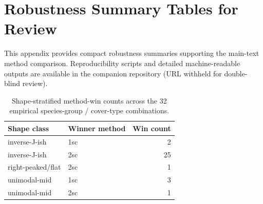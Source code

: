 \section{Robustness Summary Tables for Review}
\setcounter{table}{0}
\renewcommand{\thetable}{\thesection\arabic{table}}

This appendix provides compact robustness summaries supporting the main-text method comparison. Reproducibility scripts and detailed machine-readable outputs are available in the companion repository (URL withheld for double-blind review).

\begin{table}[htbp]
  \centering
  \caption{Shape-stratified method-win counts across the 32 empirical species-group / cover-type combinations.}
  \label{tab:app_shape_wins}
  \begin{tabular}{llr}
    \toprule
    Shape class & Winner method & Win count \\
    \midrule
    inverse-J-ish & 1sc & 2 \\
    inverse-J-ish & 2sc & 25 \\
    right-peaked/flat & 2sc & 1 \\
    unimodal-mid & 1sc & 3 \\
    unimodal-mid & 2sc & 1 \\
    \bottomrule
  \end{tabular}
\end{table}

\begin{table}[htbp]
  \centering
  \caption{Shape-stratified discrepancy and fit-failure summaries.}
  \label{tab:app_shape_metrics}
\end{table}


